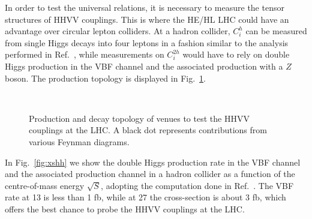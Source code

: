 
In order to test the universal relations, it is necessary to measure the tensor structures of HHVV couplings. This is where the HE/HL LHC could have an advantage over circular lepton colliders. At a hadron collider, $C^h_i$ can be measured from single Higgs decays into four leptons in a fashion similar to the analysis performed in Ref.~\cite{Sirunyan:2017tqd}, while measurements on $C^{2h}_i$ would have to rely on double Higgs production in the VBF  channel and the associated production with a $Z$ boson. The production topology is displayed in Fig.~\ref{fig:testhh}.


\begin{figure}[!t]
\centering
  \quad \ \ %
  \caption{Production and decay topology of venues to test the HHVV couplings at the LHC. A black dot represents contributions from various Feynman diagrams. \label{fig:testhh}}
\end{figure}



In Fig.~\ref{fig:xshh}  we show the double Higgs production rate in the VBF channel and the associated production channel in a hadron collider as a function of the centre-of-mass energy $\sqrt{S}$, adopting the computation done in Ref.~\cite{Frederix:2014hta}. The VBF rate at 13 \UTeV is less than 1 fb, while at 27 \UTeV the cross-section is about 3 fb, which offers the best chance to probe the HHVV couplings at the LHC. 

